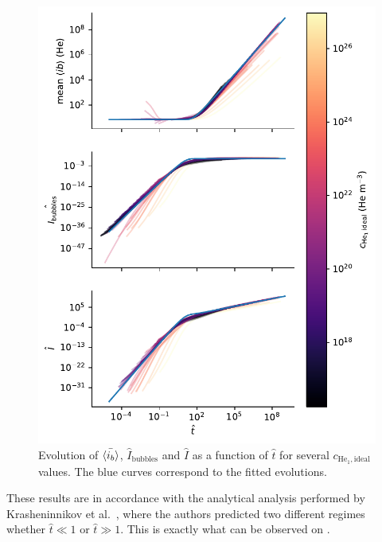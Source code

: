 \begin{figure} [h]
    \centering
    \includegraphics[width=0.75\linewidth]{Figures/Chapter4/parametric study/dimensionless_quantities.pdf}
    \caption{Evolution of $\Bar{\langle i_b \rangle}$, $\hat{I}_\mathrm{bubbles}$ and $\hat{I}$ as a function of $\hat{t}$ for several $c_{\mathrm{He}_1, \mathrm{ideal}}$ values. The blue curves correspond to the fitted evolutions.}
\end{figure}

These results are in accordance with the analytical analysis performed by Krasheninnikov et al.\ , where the authors predicted two different regimes whether $\hat{t} \ll 1$ or $\hat{t} \gg 1$.
This is exactly what can be observed on .
